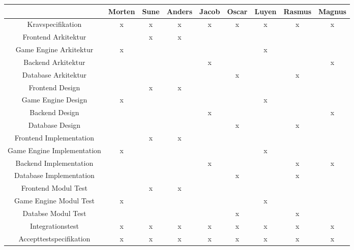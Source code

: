 \begin{center}
  \begin{longtable}{|c|c|c|c|c|c|c|c|c|}
    \hline
                                & Morten & Sune & Anders & Jacob & Oscar & Luyen & Rasmus & Magnus \\ \hline
    Kravspecifikation           & x      & x    & x      & x     & x     & x     & x      & x      \\ \hline
    Frontend Arkitektur         &        & x    & x      &       &       &       &        &        \\ \hline
    Game Engine Arkitektur      & x      &      &        &       &       & x     &        &        \\ \hline
    Backend Arkitektur          &        &      &        & x     &       &       &        & x      \\ \hline
    Database Arkitektur         &        &      &        &       & x     &       & x      &        \\ \hline
    Frontend Design             &        & x    & x      &       &       &       &        &        \\ \hline
    Game Engine Design          & x      &      &        &       &       & x     &        &        \\ \hline
    Backend Design              &        &      &        & x     &       &       &        & x      \\ \hline
    Database Design             &        &      &        &       & x     &       & x      &        \\ \hline
    Frontend Implementation     &        & x    & x      &       &       &       &        &        \\ \hline
    Game Engine Implementation  & x      &      &        &       &       & x     &        &        \\ \hline
    Backend Implementation      &        &      &        & x     &       &       & x       & x      \\ \hline
    Database Implementation     &        &      &        &       & x     &       & x      &        \\ \hline
    Frontend Modul Test         &        & x    & x      &       &       &       &        &        \\ \hline
    Game Engine Modul Test      & x      &      &        &       &       & x     &        &        \\ \hline
    Databse Modul Test          &        &      &        &       & x     &       & x      &        \\ \hline
    Integrationstest            & x      & x    & x      & x     & x     & x     & x      & x      \\ \hline
    Accepttestspecifikation     & x      & x    & x      & x     & x     & x     & x      & x      \\ \hline
  \end{longtable}
  \addtocounter{table}{-1}
\end{center}

\newpage
